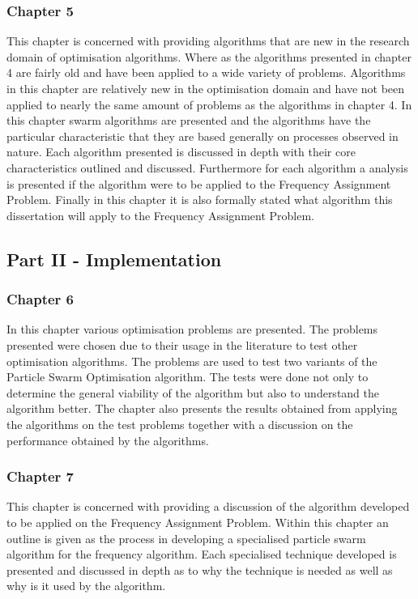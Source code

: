 \subsubsection{Chapter 5}
This chapter is concerned with providing algorithms that are new in the research domain of optimisation algorithms. Where as the algorithms presented in chapter 4 are fairly old and have been applied to a wide variety of problems. Algorithms in this chapter are relatively new in the optimisation domain and have not been applied to nearly the same amount of problems as the algorithms in chapter 4. In this chapter swarm algorithms are presented and the algorithms have the particular characteristic that they are based generally on processes observed in nature. Each algorithm presented is discussed in depth with their core characteristics outlined and discussed. Furthermore for each algorithm a analysis is presented if the algorithm were to be applied to the Frequency Assignment Problem. Finally in this chapter it is also formally stated what algorithm this dissertation will apply to the Frequency Assignment Problem.
\subsection{Part II - Implementation}
\subsubsection{Chapter 6}
In this chapter various optimisation problems are presented. The problems presented were chosen due to their usage in the literature to test other optimisation algorithms. The problems are used to test two variants of the Particle Swarm Optimisation algorithm. The tests were done not only to determine the general viability of the algorithm but also to understand the algorithm better. The chapter also presents the results obtained from applying the algorithms on the test problems together with a discussion on the performance obtained by the algorithms.
\subsubsection{Chapter 7}
This chapter is concerned with providing a discussion of the algorithm developed to be applied on the Frequency Assignment Problem. Within this chapter an outline is given as the process in developing a specialised particle swarm algorithm for the frequency algorithm. Each specialised technique developed is presented and discussed in depth as to why the technique is needed as well as why is it used by the algorithm.
